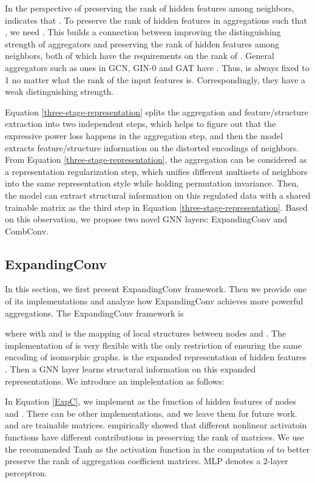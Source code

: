\documentclass{article} \usepackage{iclr2021_conference,times}
\begin{document}
In the perspective of preserving the rank of hidden features among neighbors,
 indicates that .
To preserve the rank of hidden features in aggregations such that ,
we need .
This builds a connection between improving the distinguishing strength of aggregators and preserving the rank of hidden features among neighbors,
both of which have the requirements on the rank of .
General aggregators such as ones in GCN, GIN-0 and GAT have .
Thus,  is always fixed to 1 no matter what the rank of the input features is.
Correspondingly, they have a weak distinguishing strength.

Equation \ref{three-stage-representation} splits the aggregation and feature/structure extraction into two independent steps,
which helps to figure out that the expressive power loss happens in the aggregation step,
and then the model extracts feature/structure information on the distorted encodings of neighbors.
From Equation \ref{three-stage-representation},
the aggregation can be considered as a representation regularization step,
which unifies different multisets of neighbors into the same representation style while holding permutation invariance.
Then, the model can extract structural information on this regulated data with a shared trainable matrix as the third step in Equation \ref{three-stage-representation}.
Based on this observation, we propose two novel GNN layers: ExpandingConv and CombConv.


\subsection{ExpandingConv}

In this section, we first present ExpandingConv framework.
Then we provide one of its implementations and analyze
how ExpandingConv achieves more powerful aggregations.
The ExpandingConv framework is

where  with  and
 is the mapping of local structures between nodes  and .
The implementation of  is very flexible with the only restriction of ensuring the same encoding of isomorphic graphs.
 is the expanded representation of hidden features .
Then a GNN layer  learns structural information on this expanded representations.
We introduce an implelentation as follows:

In Equation \ref{ExpC}, we implement  as the function of hidden features of nodes  and .
There can be other implementations,
and we leave them for future work.
 and  are trainable matrices.
\citep{luan2019break} empirically showed that different nonlinear activatoin functions have different contributions in preserving the rank of matrices.
We use the recommended Tanh as the activation function in the computation of  to better preserve the rank of aggregation coefficient matrices.
MLP denotes a 2-layer perceptron.
\end{document}
